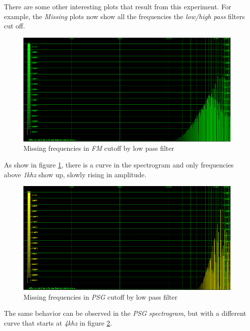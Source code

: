 \documentclass[10pt,a4paper]{report}
\begin{document}
There are some other interesting plots that result from this experiment. For example, the \textit{Missing} plots now show all the frequencies the \textit{low/high pass} filters cut off.

\begin{figure}[H]
	\centering
	\includegraphics[width=1.0\linewidth]{plots/Plot4-4-Missing-FM.png}
	\caption[Missing FM]{Missing frequencies in \textit{FM} cutoff by low pass filter}
	\label{fig:plot4-4-missing-fm}
\end{figure}

As show in figure \ref{fig:plot4-4-missing-fm}, there is a curve in the spectrogram and only frequencies above \textit{1khz} show up, slowly rising in amplitude.

\begin{figure}[H]
	\centering
	\includegraphics[width=1.0\linewidth]{plots/Plot4-5-Missing-PSG.png}
	\caption[Missing PSG]{Missing frequencies in \textit{PSG} cutoff by low pass filter}
	\label{fig:plot4-5-missing-psg}
\end{figure}

The same behavior can be observed in the \textit{PSG spectrogram}, but with a different curve that starts at \textit{4khz} in figure \ref{fig:plot4-5-missing-psg}.
\end{document}
